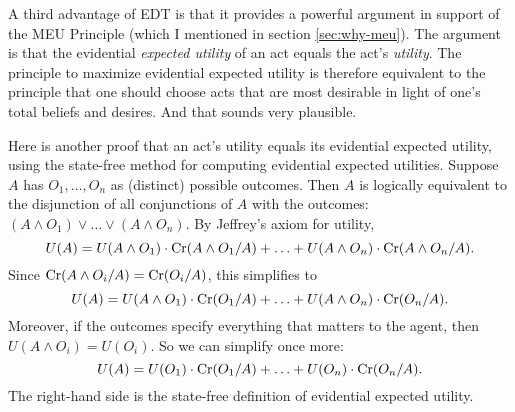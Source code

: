 
A third advantage of EDT is that it provides a powerful argument in
support of the MEU Principle (which I mentioned in section
\ref{sec:why-meu}). The argument is that the evidential \emph{expected
  utility} of an act equals the act's \emph{utility}. The principle to
maximize evidential expected utility is therefore equivalent to the
principle that one should choose acts that are most desirable in light
of one's total beliefs and desires. And that sounds very plausible.

Here is another proof that an act's utility equals its evidential
expected utility, using the state-free method for computing evidential
expected utilities. Suppose $A$ has $O_1,\ldots, O_n$ as (distinct)
possible outcomes. Then $A$ is logically equivalent to the disjunction
of all conjunctions of $A$ with the outcomes:
$(A \land O_1) \lor \ldots \lor (A \land O_n)$.
By Jeffrey's axiom for utility,
\[
U(A) = U(A\land O_1) \cdot \text{Cr}(A \land O_1/A) + \ldots +
       U(A\land O_n) \cdot \text{Cr}(A \land O_n/A).
\]
Since $\text{Cr}(A \land O_i/A) = \text{Cr}(O_i/A)$, this simplifies to
\[
U(A) = U(A\land O_1) \cdot \text{Cr}(O_1/A) + \ldots +
       U(A\land O_n) \cdot \text{Cr}(O_n/A).
\]
Moreover, if the outcomes specify everything that matters to the
agent, then $U(A \land O_i) = U(O_i)$. So we can simplify once more:
\[
U(A) = U(O_1) \cdot \text{Cr}(O_1/A) + \ldots + U(O_n) \cdot \text{Cr}(O_n/A).
\]
The right-hand side is the state-free definition of evidential expected utility.

